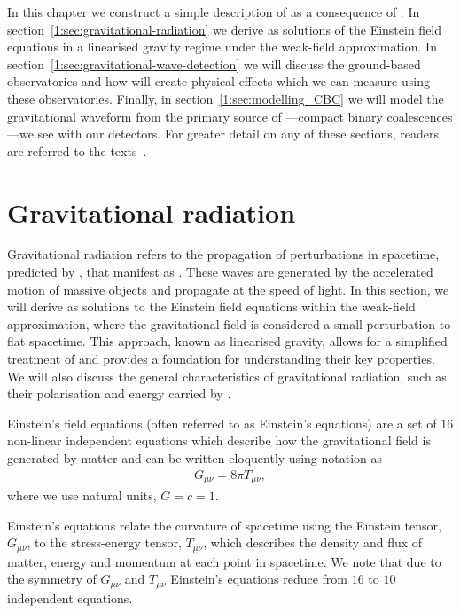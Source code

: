 In this chapter we construct a simple description of \gws as a consequence of \GR. In section~\ref{1:sec:gravitational-radiation} we derive \gws as solutions of the Einstein field equations in a linearised gravity regime under the weak-field approximation. In section~\ref{1:sec:gravitational-wave-detection} we will discuss the ground-based \gwadj observatories and how \gws will create physical effects which we can measure using these observatories. Finally, in section~\ref{1:sec:modelling_CBC} we will model the gravitational waveform from the primary source of \gws---compact binary coalescences---we see with our detectors. For greater detail on any of these sections, readers are referred to the texts~\cite{Moore_book:2012, Schutz_book:2009, Maggiore_book:2007, Creighton_book:2009}.

\section{\label{1:sec:gravitational-radiation}Gravitational radiation}

Gravitational radiation refers to the propagation of perturbations in spacetime, predicted by \GR, that manifest as \gws. These waves are generated by the accelerated motion of massive objects and propagate at the speed of light. In this section, we will derive \gws as solutions to the Einstein field equations within the weak-field approximation, where the gravitational field is considered a small perturbation to flat spacetime. This approach, known as linearised gravity, allows for a simplified treatment of \gws and provides a foundation for understanding their key properties. We will also discuss the general characteristics of gravitational radiation, such as their polarisation and energy carried by \gws.

Einstein's field equations (often referred to as Einstein's equations) are a set of $16$ non-linear independent equations which describe how the gravitational field is generated by matter and can be written eloquently using \GR notation as
%
\begin{eqnarray}
    G_{\mu\nu} = 8\pi T_{\mu\nu},
    \label{1:eqn:EFE}
\end{eqnarray}
%
where we use natural units, $G = c = 1$.

Einstein's equations relate the curvature of spacetime using the Einstein tensor, $G_{\mu\nu}$, to the stress-energy tensor, $T_{\mu\nu}$, which describes the density and flux of matter, energy and momentum at each point in spacetime. We note that due to the symmetry of $G_{\mu\nu}$ and $T_{\mu\nu}$ Einstein's equations reduce from $16$ to $10$ independent equations.

